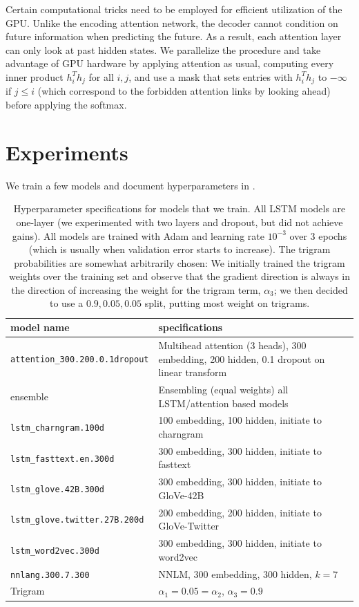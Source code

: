 \documentclass[12pt]{article}
\begin{document}
Certain computational tricks need to be employed for efficient utilization of
the GPU. Unlike the encoding attention network, the decoder cannot condition on
future information when predicting the future. As a result, each attention layer
can only look at past hidden states. We parallelize the procedure and take
advantage of GPU hardware by applying attention as usual, computing every
inner product $h_i^T h_j$ for all $i,j$, and use a mask that sets entries with
$h_i^T h_j$
to $-\infty$ if $j \le i$ (which correspond to the forbidden attention
links by looking ahead) before applying the softmax. 

\section{Experiments}
We train a few models and document hyperparameters in . 
\begin{landscape}
\begin{table}[tb]
    
    \centering
\begin{tabular}{ll}
\toprule
model name                   &specifications\\
\midrule
\texttt{attention\_300.200.0.1dropout} & Multihead attention (3 heads), 300 embedding, 200 hidden, 0.1 dropout on linear transform\\
ensemble                     & Ensembling (equal weights) all LSTM/attention based models\\
\texttt{lstm\_charngram.100d }         & 100 embedding, 100 hidden, initiate to charngram \\
\texttt{lstm\_fasttext.en.300d }       & 300 embedding, 300 hidden, initiate to fasttext \\
\texttt{lstm\_glove.42B.300d    }      & 300 embedding, 300 hidden, initiate to GloVe-42B \\
\texttt{lstm\_glove.twitter.27B.200d}  & 200 embedding, 200 hidden, initiate to GloVe-Twitter \\
\texttt{lstm\_word2vec.300d         }  & 300 embedding, 300 hidden, initiate to word2vec \\
\texttt{nnlang.300.7.300            } & NNLM, 300 embedding, 300 hidden, $k=7$\\
Trigram & $\alpha_1 = 0.05 = \alpha_2$, $\alpha_3 = 0.9$\\
\bottomrule
\end{tabular}
    \caption{Hyperparameter specifications for models that we train. All LSTM
    models are one-layer (we experimented with two layers and dropout, but did
    not achieve gains). All models are trained with Adam and learning rate
    $10^{-3}$ over 3 epochs (which is usually when validation error starts to
    increase). The trigram probabilities are somewhat arbitrarily chosen: We
    initially trained the trigram weights over the training set and observe
    that the gradient direction is always in the direction of increasing the
    weight for the trigram term, $\alpha_3$; we then decided to use a $0.9,
    0.05,0.05$ split, putting most weight on trigrams.}
    \label{tab:spec}
\end{table}
\end{landscape}
\end{document}
